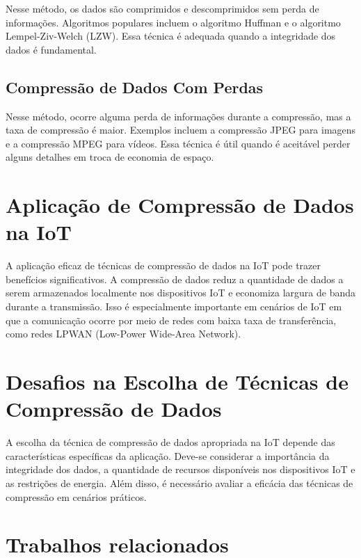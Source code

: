 Nesse método, os dados são comprimidos e descomprimidos sem perda de informações. Algoritmos populares incluem o algoritmo Huffman e o algoritmo Lempel-Ziv-Welch (LZW). Essa técnica é adequada quando a integridade dos dados é fundamental.

\subsection{Compressão de Dados Com Perdas}

Nesse método, ocorre alguma perda de informações durante a compressão, mas a taxa de compressão é maior. Exemplos incluem a compressão JPEG para imagens e a compressão MPEG para vídeos. Essa técnica é útil quando é aceitável perder alguns detalhes em troca de economia de espaço.

\section{Aplicação de Compressão de Dados na IoT}
\label{sec:AplicaçãodeCompressãodeDadosnaIoT}

A aplicação eficaz de técnicas de compressão de dados na IoT pode trazer benefícios significativos. A compressão de dados reduz a quantidade de dados a serem armazenados localmente nos dispositivos IoT e economiza largura de banda durante a transmissão. Isso é especialmente importante em cenários de IoT em que a comunicação ocorre por meio de redes com baixa taxa de transferência, como redes LPWAN (Low-Power Wide-Area Network).

\section{Desafios na Escolha de Técnicas de Compressão de Dados}
\label{sec:DesafiosnaEscolhadeTécnicasdeCompressãodeDados}

A escolha da técnica de compressão de dados apropriada na IoT depende das características específicas da aplicação. Deve-se considerar a importância da integridade dos dados, a quantidade de recursos disponíveis nos dispositivos IoT e as restrições de energia. Além disso, é necessário avaliar a eficácia das técnicas de compressão em cenários práticos.

\section{Trabalhos relacionados}
\label{sec:TrabalhosRelacionados}

